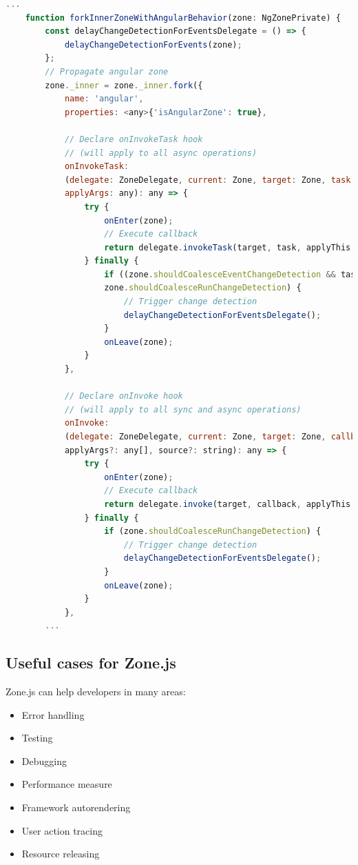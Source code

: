\begin{lstlisting}[language=Javascript]
    ...
    function forkInnerZoneWithAngularBehavior(zone: NgZonePrivate) {
        const delayChangeDetectionForEventsDelegate = () => {
            delayChangeDetectionForEvents(zone);
        };
        // Propagate angular zone
        zone._inner = zone._inner.fork({
            name: 'angular',
            properties: <any>{'isAngularZone': true},
            
            // Declare onInvokeTask hook 
            // (will apply to all async operations)
            onInvokeTask:
            (delegate: ZoneDelegate, current: Zone, target: Zone, task: Task, applyThis: any,
            applyArgs: any): any => {
                try {
                    onEnter(zone);
                    // Execute callback
                    return delegate.invokeTask(target, task, applyThis, applyArgs);
                } finally {
                    if ((zone.shouldCoalesceEventChangeDetection && task.type === 'eventTask') ||
                    zone.shouldCoalesceRunChangeDetection) {
                        // Trigger change detection
                        delayChangeDetectionForEventsDelegate();
                    }
                    onLeave(zone);
                }
            },
            
            // Declare onInvoke hook 
            // (will apply to all sync and async operations)
            onInvoke:
            (delegate: ZoneDelegate, current: Zone, target: Zone, callback: Function, applyThis: any,
            applyArgs?: any[], source?: string): any => {
                try {
                    onEnter(zone);
                    // Execute callback
                    return delegate.invoke(target, callback, applyThis, applyArgs, source);
                } finally {
                    if (zone.shouldCoalesceRunChangeDetection) {
                        // Trigger change detection
                        delayChangeDetectionForEventsDelegate();
                    }
                    onLeave(zone);
                }
            },
        ...
\end{lstlisting}
\autocite{ngZoneSrc}

\subsection{Useful cases for Zone.js}
Zone.js can help developers in many areas: 
\begin{itemize}
	\item Error handling
	\item Testing
	\item Debugging
	\item Performance measure
	\item Framework autorendering
	\item User action tracing
	\item Resource releasing
\end{itemize}
\autocite{ngHouston2019}

